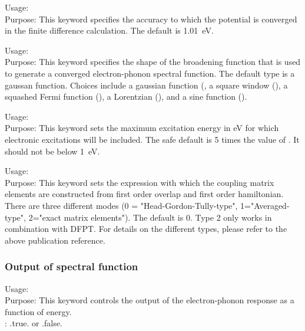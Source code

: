  {
\noindent
Usage:  \\
Purpose: This keyword specifies the accuracy to which the potential is converged in the finite difference calculation. The default is 1.01~eV.\\
}

 {
\noindent
Usage:  \\
Purpose: This keyword specifies the shape of the broadening function that is used to generate a converged electron-phonon spectral function. The default type is a gaussan function. Choices include a gaussian function (, a square window (), a squashed Fermi function (), a Lorentzian (), and a sine function ().\\
}

 {
\noindent
Usage:  \\
Purpose: This keyword sets the maximum excitation energy in eV for which electronic excitations will be included. The safe default is 5 times the value of . It should not be below 1~eV. \\
}

 {
\noindent
Usage:  \\
Purpose: This keyword sets the expression with which the coupling matrix elements are constructed from first order overlap and first order hamiltonian. There are three different modes (0 = "Head-Gordon-Tully-type", 1="Averaged-type", 2="exact matrix elements"). The default is 0. Type 2 only works in combination with DFPT. For details on the different types, please refer to the above publication reference. \\
}

\subsubsection{Output of spectral function}

 {
\noindent
Usage:  \\
Purpose: This keyword controls the output of the electron-phonon response as a function of energy. \\ 
: .true. or .false.\\
}

